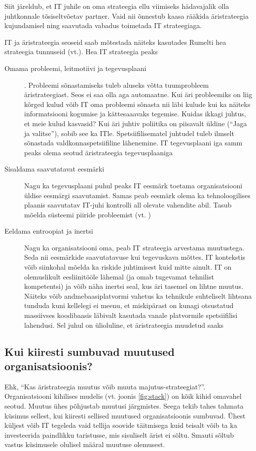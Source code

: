 Siit järeldub, et IT juhile on oma strateegia ellu viimiseks hädavajalik olla juhtkonnale tõsiseltvõetav partner. Vaid nii õnnestub kaasa rääkida äristrateegia kujundamisel ning saavutada vabadus toimetada IT strateegiaga. 

IT ja äristrateegia seoseid saab mõtestada näiteks kasutades Rumelti hea strateegia tunnuseid (vt.). Hea IT strateegia peaks
\begin{description}
	\item[Omama probleemi, leitmotiivi ja tegevusplaani]. Probleemi sõnastamiseks tuleb aluseks võtta tuumprobleem äristrateegiast. Seos ei saa olla aga automaatne. Kui äri probleemiks on liig kõrged kulud võib IT oma probleemi sõnasta nii läbi kulude kui ka näiteks informatsiooni kogumise ja kättesaaavaks tegemise. Kuidas ikkagi juhtus, et meie kulud kasvasid? Kui äri juhtiv poliitika on piisavalt üldine (\enquote{Jaga ja valitse}), sobib see ka ITle. Spetsiifilisematel juhtudel tuleb ilmselt sõnastada valdkonnaspetsiifiline lähenemine. IT tegevusplaani iga samm peaks olema seotud äristrateegia tegevusplaaniga
	\item[Sisaldama saavutatavat eesmärki] Nagu ka tegevusplaani puhul peaks IT eesmärk toetama organisatsiooni üldise eesmärgi saavutamist. Samas peab eesmärk olema ka tehnoloogilises plaanis saavutatav IT-juhi kontrolli all olevate vahendite abil. Tasub mõelda süsteemi piiride probleemist (vt. )
	\item[Eeldama entroopiat ja inertsi] Nagu ka organisatsiooni oma, peab IT strateegia arvestama muutustega. Seda nii eesmärkide saavutatavuse kui tegevuskava mõttes. IT kontekstis võib siinkohal mõelda ka riskide juhtimisest kuid mitte ainult. IT on olemuslikult eesliinitööle lähemal (ja omab tugevamat tehnilist kompetentsi) ja võib näha inertsi seal, kus äri tasemel on lihtne muutus. Näiteks võib andmebaasiplatvormi vahetus ka tehnikule suhteliselt lihtsana tunduda kuni kellelegi ei meenu, et miskipärast on kunagi otsustatud massiivses koodibaasis läbivalt kasutada vanale platvormile spetsiifilisi lahendusi. Sel juhul on ülioluline, et äristrateegia muudetud saaks
\end{description}

\subsection{Kui kiiresti sumbuvad muutused organisatsioonis?}
Ehk, \enquote{Kas äristrateegia muutus võib muuta majutus-strateegiat?}. Organisatsiooni kihilises mudelis (vt. joonis \ref{fig:stack}) on kõik kihid omavahel seotud. Muutus ühes põhjustab muutusi järgmistes. Seega tekib tahes tahmata küsimus sellest, kui kiiresti sellised muutused organisatsioonis sumbuvad. Ühest küljest võib IT tegeleda vaid tellija soovide täitmisega kuid teisalt võib ta ka investeerida paindlikku taristusse, mis sisuliselt ärist ei sõltu. Smauti sõltub vastus küsimusele olulisel määral muutuse olemusest.

